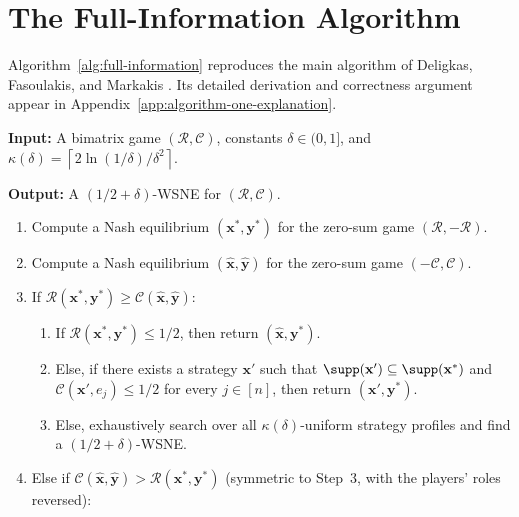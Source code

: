 \section{The Full-Information Algorithm}

Algorithm~\ref{alg:full-information} reproduces the main algorithm of Deligkas, Fasoulakis, and Markakis \cite[Algorithm~1]{12WSNE}. Its detailed derivation and correctness argument appear in Appendix~\ref{app:algorithm-one-explanation}.

\begin{algorithm}[H]
  \caption{Main Algorithm for \((1/2+\delta)\)-WSNE}
  \label{alg:full-information}
  \small
  \textbf{Input:} A bimatrix game \((\mathcal{R},\mathcal{C})\), constants
  \(\delta\in(0,1]\), and
  \(\kappa(\delta)=\left\lceil 2\ln(1/\delta)/\delta^2\right\rceil\).\par
  \textbf{Output:} A \((1/2+\delta)\)-WSNE for \((\mathcal{R},\mathcal{C})\).
  \begin{enumerate}[label=\arabic*.,leftmargin=1.8em,itemsep=0.25em,topsep=0.4em]
    \item Compute a Nash equilibrium \((\mathbf{x}^*,\mathbf{y}^*)\) for the zero-sum game \((\mathcal{R},-\mathcal{R})\).
    \item Compute a Nash equilibrium \((\hat{\mathbf{x}},\hat{\mathbf{y}})\) for the zero-sum game \((-\mathcal{C},\mathcal{C})\).
    \item If \(\mathcal{R}(\mathbf{x}^*,\mathbf{y}^*)\geq \mathcal{C}(\hat{\mathbf{x}},\hat{\mathbf{y}})\):
      \begin{enumerate}[label=(\alph*),leftmargin=2.2em,itemsep=0.15em,topsep=0.1em]
        \item If \(\mathcal{R}(\mathbf{x}^*,\mathbf{y}^*)\leq 1/2\), then return \((\hat{\mathbf{x}},\mathbf{y}^*)\).
        \item Else, if there exists a strategy \(\mathbf{x}'\) such that
        \(\supp(\mathbf{x}')\subseteq\supp(\mathbf{x}^*)\) and
        \(\mathcal{C}(\mathbf{x}',e_j)\leq 1/2\) for every \(j\in[n]\), then return \((\mathbf{x}',\mathbf{y}^*)\).
        \item Else, exhaustively search over all \(\kappa(\delta)\)-uniform strategy profiles and find a \((1/2+\delta)\)-WSNE.
      \end{enumerate}
    \item Else if \(\mathcal{C}(\hat{\mathbf{x}},\hat{\mathbf{y}})>\mathcal{R}(\mathbf{x}^*,\mathbf{y}^*)\) (symmetric to Step~3, with the players' roles reversed):
      \begin{enumerate}[label=(\alph*),leftmargin=2.2em,itemsep=0.15em,topsep=0.1em]

\end{enumerate}
\end{enumerate}
\end{algorithm}
